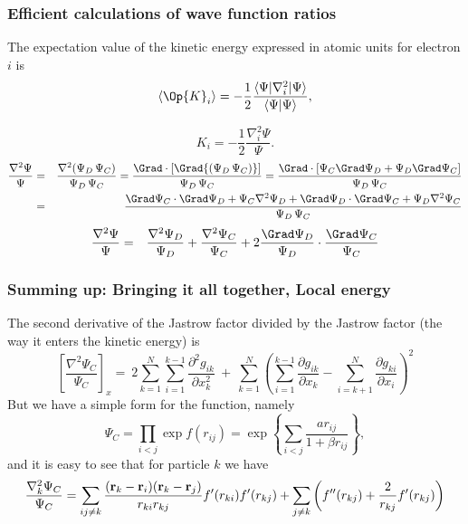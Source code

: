\frame
 {
   \frametitle{Efficient calculations of wave function ratios}
 \begin{small}
 {\scriptsize

The expectation value of the kinetic energy expressed in atomic units for electron $i$ is 
\begin{equation}
 \langle \Op{K}_i \rangle = -\frac{1}{2}\frac{\langle\Psi|\nabla_{i}^2|\Psi \rangle}{\langle\Psi|\Psi \rangle},
\end{equation}

\begin{equation}\label{kineticE}
K_i = -\frac{1}{2}\frac{\nabla_{i}^{2} \Psi}{\Psi}.
\end{equation}
\begin{eqnarray}
\frac{\nabla^2 \Psi}{\Psi} & = & \frac{\nabla^2 ({\Psi_{D} \,  \Psi_C})}{\Psi_{D} \,  \Psi_C} = \frac{\Grad \cdot [\Grad {(\Psi_{D} \,  \Psi_C)}]}{\Psi_{D} \,  \Psi_C} = \frac{\Grad \cdot [ \Psi_C \Grad \Psi_{D} + \Psi_{D} \Grad  \Psi_C]}{\Psi_{D} \,  \Psi_C}\nonumber\\
&  = & \frac{\Grad  \Psi_C \cdot \Grad \Psi_{D} +  \Psi_C \nabla^2 \Psi_{D} + \Grad \Psi_{D} \cdot \Grad  \Psi_C + \Psi_{D} \nabla^2  \Psi_C}{\Psi_{D} \,  \Psi_C}\nonumber\\
\end{eqnarray}
\begin{eqnarray}
\frac{\nabla^2 \Psi}{\Psi}
& = & \frac{\nabla^2 \Psi_{D}}{\Psi_{D}} + \frac{\nabla^2  \Psi_C}{ \Psi_C} + 2 \frac{\Grad \Psi_{D}}{\Psi_{D}}\cdot\frac{\Grad  \Psi_C}{ \Psi_C}
\end{eqnarray}
 }
 \end{small}
 }


\frame
{
  \frametitle{Summing up: Bringing it all together, Local energy}
\begin{small}
{\scriptsize

The second derivative of the Jastrow factor divided by the Jastrow factor (the way it enters the kinetic energy) is
\[
\left[\frac{\nabla^2 \Psi_C}{\Psi_C}\right]_x =\  
2\sum_{k=1}^{N}
\sum_{i=1}^{k-1}\frac{\partial^2 g_{ik}}{\partial x_k^2}\ +\ 
\sum_{k=1}^N
\left(
\sum_{i=1}^{k-1}\frac{\partial g_{ik}}{\partial x_k} -
\sum_{i=k+1}^{N}\frac{\partial g_{ki}}{\partial x_i}
\right)^2
\]
But we have a simple form for the function, namely
\[
\Psi_{C}=\prod_{i< j}\exp{f(r_{ij})}= \exp{\left\{\sum_{i<j}\frac{ar_{ij}}{1+\beta r_{ij}}\right\}},
\]
and it is easy to see that for particle  $k$
we have
\[
  \frac{\nabla^2_k \Psi_C}{\Psi_C }=
\sum_{ij\ne k}\frac{({\bf r}_k-{\bf r}_i)({\bf r}_k-{\bf r}_j)}{r_{ki}r_{kj}}f'(r_{ki})f'(r_{kj})+
\sum_{j\ne k}\left( f''(r_{kj})+\frac{2}{r_{kj}}f'(r_{kj})\right)
\]
}
\end{small}
}



